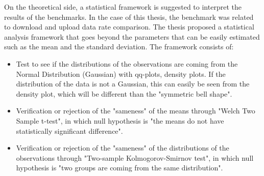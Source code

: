 \documentclass[12pt, oneandhalf, chaparabic, sees, ms]{metu}
\begin{document}
On the theoretical side, a statistical framework is suggested
to interpret the results of the benchmarks. In the case of this thesis, the benchmark was related to download and upload data rate comparison.
The thesis proposed a statistical analysis framework that goes beyond the parameters that can be easily estimated such as the mean and
the standard deviation. The framework consists of: 
\begin{itemize} 
\setlength{\itemsep}{0em}
\item Test to see if the distributions of the observations are coming from the Normal Distribution (Gaussian) with qq-plots, density plots. 
If the distribution of the data is not a Gaussian, this can easily be seen from the density plot, which will be different than the "symmetric bell shape".
\item Verification or rejection of the "sameness" of the means through "Welch Two Sample t-test", in which null hypothesis is "the means do not have statistically significant difference".
\item Verification or rejection of the "sameness" of the distributions of the observations through "Two-sample Kolmogorov-Smirnov test", in which null hypothesis is "two groups are coming
 from the same distribution".
\end{itemize} 



\newpage
\end{document}
